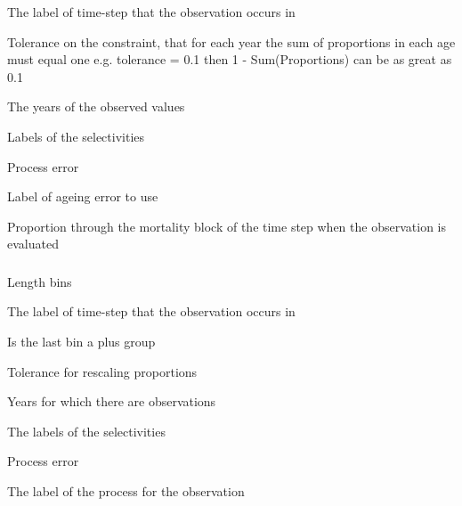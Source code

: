  {The label of time-step that the observation occurs in}

 {Tolerance on the constraint, that for each year the sum of proportions in each age must equal one e.g. tolerance = 0.1 then 1 - Sum(Proportions) can be as great as 0.1}

 {The years of the observed values}

 {Labels of the selectivities}

 {Process error}

 {Label of ageing error to use}

 {Proportion through the mortality block of the time step when the observation is evaluated}

\subsubsection[Process Proportions At Length]{}

 {Length bins}

 {The label of time-step that the observation occurs in}

 {Is the last bin a plus group}

 {Tolerance for rescaling proportions}

 {Years for which there are observations}

 {The labels of the selectivities}

 {Process error}

 {The label of the process for the observation}

